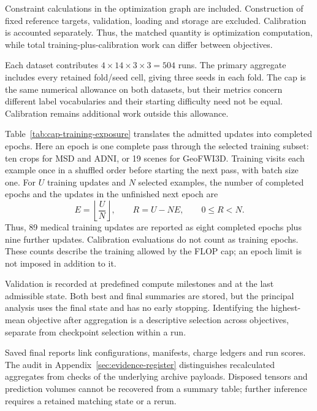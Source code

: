 \documentclass[12pt,a4paper]{article}
\begin{document}
Constraint calculations in the optimization graph are included.
Construction of fixed reference targets, validation,
loading and storage are excluded. Calibration is accounted separately.
Thus, the matched quantity is optimization computation, while total
training-plus-calibration work can differ between objectives.

Each dataset contributes $4\times14\times3\times3=504$ runs.
The primary aggregate includes every retained fold/seed cell, giving
three seeds in each fold. The cap is the same numerical allowance on
both datasets, but their metrics concern different label vocabularies
and their starting difficulty need not be equal. Calibration remains
additional work outside this allowance.

Table~\ref{tab:cap-training-exposure} translates the admitted updates
into completed epochs. Here an epoch is one complete pass through the
selected training subset: ten crops for MSD and ADNI, or 19 scenes for
GeoFWI3D. Training visits each example once in a shuffled order before
starting the next pass, with batch size one. For $U$ training updates
and $N$ selected examples, the number of completed epochs and the
updates in the unfinished next epoch are
\begin{equation}
 E=\left\lfloor\frac{U}{N}\right\rfloor,
 \qquad R=U-NE,\qquad 0\leq R<N.
\label{eq:completed-training-epochs}
\end{equation}
Thus, 89 medical training updates are reported as eight completed
epochs plus nine further updates. Calibration evaluations do not count
as training epochs. These counts describe the training allowed by the
FLOP cap; an epoch limit is not imposed in addition to it.



Validation is recorded at predefined compute milestones and at the last
admissible state. Both best and final summaries are stored, but the
principal analysis uses the final state and has no early stopping.
Identifying the highest-mean objective after aggregation is a descriptive
selection across objectives, separate from checkpoint selection within
a run.

Saved final reports link configurations, manifests, charge ledgers and
run scores. The audit in Appendix~\ref{sec:evidence-register} distinguishes
recalculated aggregates from checks of the underlying archive payloads.
Disposed tensors and prediction volumes cannot be recovered from a
summary table; further inference requires a retained matching state
or a rerun.
\end{document}
